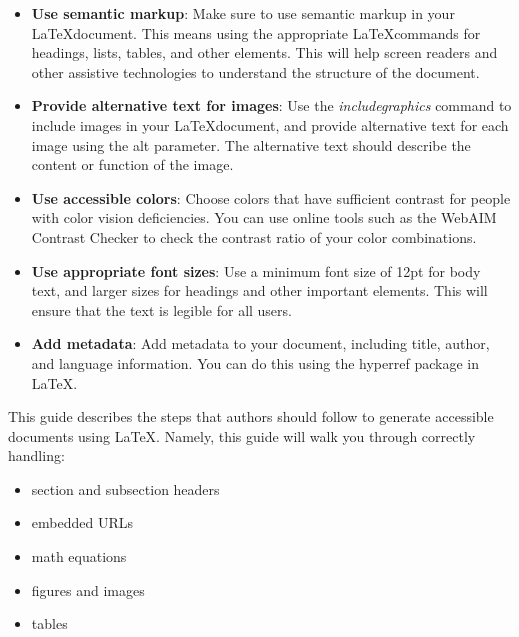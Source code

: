 \documentclass{llncs}
\begin{document}
\begin{itemize}
\item \textbf{Use semantic markup}: Make sure to use semantic markup in your
  \LaTeX document. This means using the appropriate \LaTeX commands for
  headings, lists, tables, and other elements. This will help screen readers and
  other assistive technologies to understand the structure of the document.

\item \textbf{Provide alternative text for images}: Use the
  \textit{includegraphics} command to include images in your \LaTeX document,
  and provide alternative text for each image using the alt parameter. The
  alternative text should describe the content or function of the image.

\item \textbf{Use accessible colors}: Choose colors that have sufficient
  contrast for people with color vision deficiencies. You can use online tools
  such as the WebAIM Contrast Checker to check the contrast ratio of your color
  combinations.

\item \textbf{Use appropriate font sizes}: Use a minimum font size of 12pt for
  body text, and larger sizes for headings and other important elements. This
  will ensure that the text is legible for all users.

\item \textbf{Add metadata}: Add metadata to your document, including title,
  author, and language information. You can do this using the hyperref package
  in \LaTeX.


\end{itemize}


This guide describes the steps that authors should follow to generate accessible
documents using \LaTeX. Namely, this guide will walk you through correctly
handling:

\begin{itemize}
  \item section and subsection headers
  \item embedded URLs
  \item math equations
  \item figures and images
  \item tables
\end{itemize}
\end{document}
